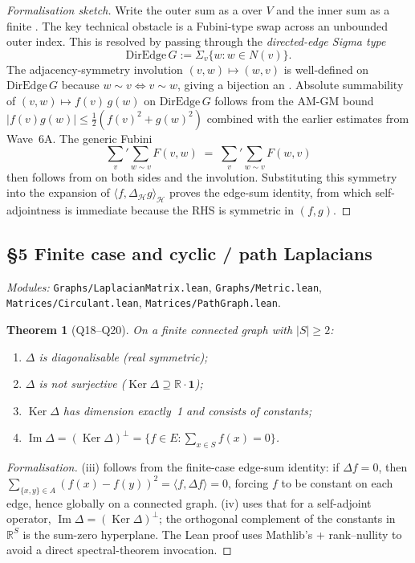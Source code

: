 \documentclass[11pt,a4paper]{article}
\newcommand{\lmod}[1]{\texttt{\small #1}}
\newcommand{\R}{\mathbb{R}}
\newcommand{\HH}{\mathcal{H}}
\newcommand{\Adj}{\sim}
\newcommand{\Ker}{\operatorname{Ker}}
\newcommand{\ImM}{\operatorname{Im}}
\theoremstyle{plain}
\newtheorem{theorem}{Theorem}[section]
\theoremstyle{definition}
\begin{document}
\begin{proof}[Formalisation sketch]
Write the outer sum as a  over $V$ and the inner sum as a
finite . The key technical obstacle is a Fubini-type
swap across an unbounded outer index. This is resolved by passing
through the \emph{directed-edge Sigma type}
\[ \text{DirEdge}\,G := \Sigma_v\{w : w \in N(v)\}. \]
The adjacency-symmetry involution $(v, w) \mapsto (w, v)$ is
well-defined on $\text{DirEdge}\,G$ because $w \Adj v \iff v \Adj w$,
giving a bijection
an . Absolute summability of
$(v, w) \mapsto f(v)\,g(w)$ on $\text{DirEdge}\,G$ follows from the
AM-GM bound $|f(v) g(w)| \leq \tfrac12(f(v)^2 + g(w)^2)$ combined with
the earlier estimates from Wave~6A. The generic Fubini
\[
\sum_v' \sum_{w \Adj v} F(v, w) \;=\; \sum_v' \sum_{w \Adj v} F(w, v)
\]
then follows from  on both sides and the
involution. Substituting this symmetry into the expansion of
$\langle f, \Delta_\HH g\rangle_\HH$ proves the edge-sum identity,
from which self-adjointness is immediate because the RHS is symmetric
in $(f, g)$.
\end{proof}

\subsection{\S5 Finite case and cyclic / path Laplacians}
\emph{Modules:} \lmod{Graphs/LaplacianMatrix.lean}, \lmod{Graphs/Metric.lean},
\lmod{Matrices/Circulant.lean}, \lmod{Matrices/PathGraph.lean}.

\begin{theorem}[Q18--Q20]
On a finite connected graph with $|S| \geq 2$:
\begin{enumerate}[label=(\roman*), leftmargin=2em]
  \item $\Delta$ is diagonalisable (real symmetric);
  \item $\Delta$ is \emph{not} surjective ($\Ker\Delta \supseteq
        \R\cdot\mathbf 1$);
  \item $\Ker\Delta$ has dimension exactly~1 and consists of constants;
  \item $\ImM \Delta = (\Ker\Delta)^\perp =
        \{f \in E : \sum_{x \in S} f(x) = 0\}$.
\end{enumerate}
\end{theorem}

\begin{proof}[Formalisation]
(iii) follows from the finite-case edge-sum identity: if $\Delta f = 0$,
then $\sum_{\{x,y\}\in A}(f(x)-f(y))^2 = \langle f, \Delta f\rangle = 0$,
forcing $f$ to be constant on each edge, hence globally on a connected
graph. (iv) uses that for a self-adjoint operator, $\ImM\Delta =
(\Ker\Delta)^\perp$; the orthogonal complement of the constants in
$\R^S$ is the sum-zero hyperplane. The Lean proof uses Mathlib's
+ rank--nullity to avoid a direct spectral-theorem invocation.
\end{proof}
\end{document}
